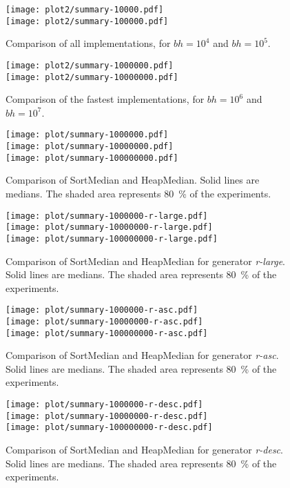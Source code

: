 \documentclass[a4paper,11pt]{article}
\begin{document}
\begin{figure}
    \centering
    \texttt{[image: plot2/summary-10000.pdf]}\\
    \texttt{[image: plot2/summary-100000.pdf]}
    \caption{Comparison of all implementations, for $bh = 10^4$ and $bh = 10^5$.}\label{fig:othera}
\end{figure}

\begin{figure}
    \centering
    \texttt{[image: plot2/summary-1000000.pdf]}\\
    \texttt{[image: plot2/summary-10000000.pdf]}
    \caption{Comparison of the fastest implementations, for $bh = 10^6$ and $bh = 10^7$.}\label{fig:otherb}
\end{figure}

\newcommand{\figexpl}{Solid lines are medians. The shaded area represents 80~\% of the experiments.}

\begin{figure}
    \centering
    \texttt{[image: plot/summary-1000000.pdf]}\\
    \texttt{[image: plot/summary-10000000.pdf]}\\
    \texttt{[image: plot/summary-100000000.pdf]}
    \caption{Comparison of SortMedian and HeapMedian. \figexpl}\label{fig:summary}
\end{figure}

\begin{figure}
    \centering
    \texttt{[image: plot/summary-1000000-r-large.pdf]}\\
    \texttt{[image: plot/summary-10000000-r-large.pdf]}\\
    \texttt{[image: plot/summary-100000000-r-large.pdf]}
    \caption{Comparison of SortMedian and HeapMedian for generator \emph{r-large}. \figexpl}\label{fig:summary-r-large}
\end{figure}

\begin{figure}
    \centering
    \texttt{[image: plot/summary-1000000-r-asc.pdf]}\\
    \texttt{[image: plot/summary-10000000-r-asc.pdf]}\\
    \texttt{[image: plot/summary-100000000-r-asc.pdf]}
    \caption{Comparison of SortMedian and HeapMedian for generator \emph{r-asc}. \figexpl}\label{fig:summary-r-asc}
\end{figure}

\begin{figure}
    \centering
    \texttt{[image: plot/summary-1000000-r-desc.pdf]}\\
    \texttt{[image: plot/summary-10000000-r-desc.pdf]}\\
    \texttt{[image: plot/summary-100000000-r-desc.pdf]}
    \caption{Comparison of SortMedian and HeapMedian for generator \emph{r-desc}. \figexpl}\label{fig:summary-r-desc}
\end{figure}
\end{document}
